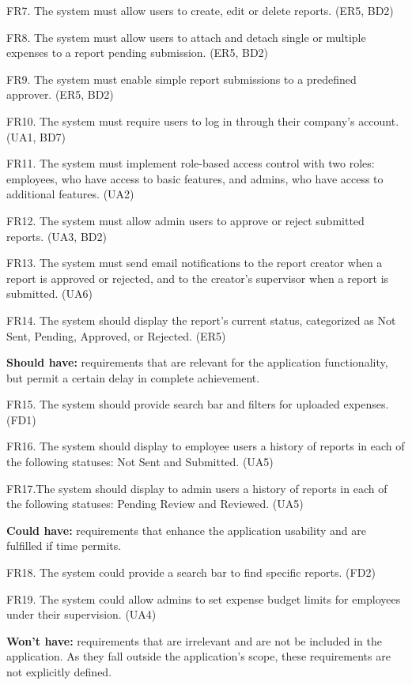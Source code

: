 FR7. The system must allow users to create, edit or delete reports. (ER5, BD2)

FR8. The system must allow users to attach and detach single or multiple expenses to a report pending submission. (ER5, BD2)

FR9. The system must enable simple report submissions to a predefined approver.  (ER5, BD2)

FR10. The system must require users to log in through their company's account. (UA1, BD7)

FR11. The system must implement role-based access control with two roles: employees, who have access to basic features, and admins, who have access to additional features. (UA2)

FR12. The system must allow admin users to approve or reject submitted reports. (UA3, BD2)

FR13. The system must send email notifications to the report creator when a report is approved or rejected, and to the creator's supervisor when a report is submitted. (UA6)

FR14. The system should display the report's current status, categorized as Not Sent, Pending, Approved, or Rejected. (ER5)

\textbf{Should have:} requirements that are relevant for the application functionality, but permit a certain delay in complete achievement.

FR15. The system should provide search bar and filters for uploaded expenses. (FD1)

FR16. The system should display to employee users a history of reports in each of the following statuses: Not Sent and Submitted. (UA5)

FR17.The system should display to admin users a history of reports in each of the following statuses: Pending Review and Reviewed. (UA5)

\textbf{Could have:} requirements that enhance the application usability and are fulfilled if time permits.

FR18. The system could provide a search bar to find specific reports. (FD2)

FR19. The system could allow admins to set expense budget limits for employees under their supervision. (UA4)

\textbf{Won't have:} requirements that are irrelevant and are not be included in the application. As they fall outside the application's scope, these requirements are not explicitly defined.

